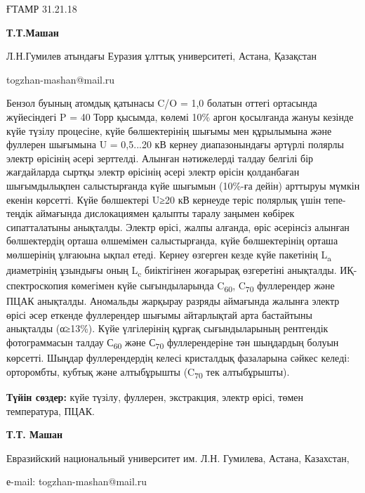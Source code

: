 \newpage
ҒТАМР 31.21.18


\begin{center}
{\bfseries Т.Т.Машан}

Л.Н.Гумилев атындағы Еуразия ұлттық университеті, Астана, Қазақстан

togzhan-mashan@mail.ru
\end{center}

Бензол буының атомдық қатынасы C/O = 1,0 болатын оттегі ортасында
жүйесіндегі P = 40 Торр қысымда, көлемі 10\% аргон қосылғанда жануы
кезінде күйе түзілу процесіне, күйе бөлшектерінің шығымы мен құрылымына
және фуллерен шығымына U = 0,5...20 кВ кернеу диапазонындағы әртүрлі
полярлы электр өрісінің әсері зерттелді. Алынған нәтижелерді талдау
белгілі бір жағдайларда сыртқы электр өрісінің әсері электр өрісін
қолданбаған шығымдылықпен салыстырғанда күйе шығымын (10\%-ға дейін)
арттыруы мүмкін екенін көрсетті. Күйе бөлшектері U≥20 кВ кернеуде теріс
полярлық үшін тепе-теңдік аймағында дислокациямен қалыпты таралу заңымен
көбірек сипатталатыны анықталды. Электр өрісі, жалпы алғанда, өріс
әсерінсіз алынған бөлшектердің орташа өлшемімен салыстырғанда, күйе
бөлшектерінің орташа мөлшерінің ұлғаюына ықпал етеді. Кернеу өзгерген
кезде күйе пакетінің L\textsubscript{a} диаметрінің ұзындығы оның
L\textsubscript{c} биіктігінен жоғарырақ өзгеретіні анықталды.
ИҚ-спектроскопия көмегімен күйе сығындыларында C\textsubscript{60},
C\textsubscript{70} фуллерендер және ПЦАК анықталды. Аномальды жарқырау
разряды аймағында жалынға электр өрісі әсер еткенде фуллерендер шығымы
айтарлықтай арта бастайтыны анықталды (α≥13\%). Күйе үлгілерінің құрғақ
сығындыларының рентгендік фотограммасын талдау С\textsubscript{60} және
С\textsubscript{70} фуллерендеріне тән шыңдардың болуын көрсетті. Шыңдар
фуллерендердің келесі кристалдық фазаларына сәйкес келеді: орторомбты,
кубтық және алтыбұрышты (C\textsubscript{70} тек алтыбұрышты).

{\bfseries Түйін сөздер:} күйе түзілу, фуллерен, экстракция, электр өрісі,
төмен температура, ПЦАК.


\begin{center}
{\bfseries Т.Т. Машан}

Евразийский национальный университет им. Л.Н. Гумилева, Астана,
Казахстан,

е-mail: togzhan-mashan@mail.ru
\end{center}

